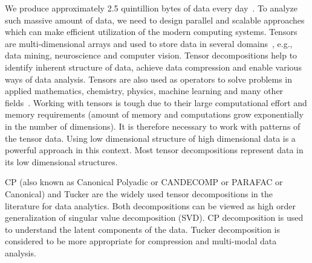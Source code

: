 \documentclass[a4paper,11pt]{article}
\newcommand{\sk}[1]{{\color{blue} \emph{#1}}}
\begin{document}
	
	We produce approximately 2.5 quintillion bytes of data every day~\cite{data-size}. To analyze such massive amount of data, we need to design parallel and scalable approaches which can make efficient utilization of the modern computing systems. Tensors are multi-dimensional arrays and used to store data in several domains~\cite{KB-SIAM-2009}, e.g., data mining, neuroscience and computer vision. Tensor decompositions help to identify inherent structure of data, achieve data compression and enable various ways of data analysis. Tensors are also used as operators to solve problems in applied mathematics, chemistry, physics, machine learning and many other fields~\cite{KB-SIAM-2009,NPOV-NIPS-2015}. Working with tensors is tough due to their large computational effort and memory requirements (amount of memory and computations grow exponentially in the number of dimensions). It is therefore necessary to work with patterns of the tensor data. Using low dimensional structure of high dimensional data is a powerful approach in this context. Most tensor decompositions represent data in its low dimensional structures.
		
	
	
	CP (also known as Canonical Polyadic or CANDECOMP or PARAFAC or Canonical) and Tucker are the widely used tensor decompositions in the literature for data analytics. Both decompositions can be viewed as high order generalization of singular value decomposition (SVD). CP decomposition is used to understand the latent components of the data. Tucker decomposition is considered to be more appropriate for compression and multi-modal data analysis.
	
\end{document}
